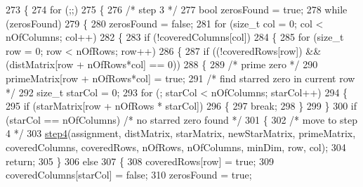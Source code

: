\begin{DoxyCode}
273 \{
274     \textcolor{keywordflow}{for} (;;)
275     \{
276         \textcolor{comment}{/* step 3 */}
277         \textcolor{keywordtype}{bool} zerosFound = \textcolor{keyword}{true};
278         \textcolor{keywordflow}{while} (zerosFound)
279         \{
280             zerosFound = \textcolor{keyword}{false};
281             \textcolor{keywordflow}{for} (\textcolor{keywordtype}{size\_t} col = 0; col < nOfColumns; col++)
282             \{
283                 \textcolor{keywordflow}{if} (!coveredColumns[col])
284                 \{
285                     \textcolor{keywordflow}{for} (\textcolor{keywordtype}{size\_t} row = 0; row < nOfRows; row++)
286                     \{
287                         \textcolor{keywordflow}{if} ((!coveredRows[row]) && (distMatrix[row + nOfRows*col] == 0))
288                         \{
289                             \textcolor{comment}{/* prime zero */}
290                             primeMatrix[row + nOfRows*col] = \textcolor{keyword}{true};
291                             \textcolor{comment}{/* find starred zero in current row */}
292                             \textcolor{keywordtype}{size\_t} starCol = 0;
293                             \textcolor{keywordflow}{for} (; starCol < nOfColumns; starCol++)
294                             \{
295                                 \textcolor{keywordflow}{if} (starMatrix[row + nOfRows * starCol])
296                                 \{
297                                     \textcolor{keywordflow}{break};
298                                 \}
299                             \}
300                             \textcolor{keywordflow}{if} (starCol == nOfColumns) \textcolor{comment}{/* no starred zero found */}
301                             \{
302                                 \textcolor{comment}{/* move to step 4 */}
303                                 \mbox{\hyperlink{class_assignment_problem_solver_a6ea85d386a136effd84c00f4e2f3cd77}{step4}}(assignment, distMatrix, starMatrix, newStarMatrix, primeMatrix, 
      coveredColumns, coveredRows, nOfRows, nOfColumns, minDim, row, col);
304                                 \textcolor{keywordflow}{return};
305                             \}
306                             \textcolor{keywordflow}{else}
307                             \{
308                                 coveredRows[row] = \textcolor{keyword}{true};
309                                 coveredColumns[starCol] = \textcolor{keyword}{false};
310                                 zerosFound = \textcolor{keyword}{true};

\end{DoxyCode}
